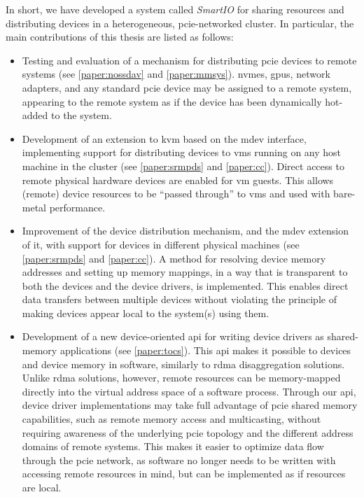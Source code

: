 In short, we have developed a system called \emph{SmartIO} for sharing resources and distributing devices in a heterogeneous, \gls{pcie}-networked cluster. 
%
In particular, the main contributions of this thesis are listed as follows:
\begin{itemize}
    \item Testing and evaluation of a mechanism for distributing \gls{pcie} devices to remote systems (see \cref{paper:nossdav} and \cref{paper:mmsys}). \Glspl{nvme}, \glspl{gpu}, network adapters, and any standard \gls{pcie} device may be assigned to a remote system, appearing to the remote system as if the device has been dynamically hot-added to the system.

	\item Development of an extension to \gls{kvm} based on the \gls{mdev} interface, implementing support for distributing devices to \glspl{vm} running on any host machine in the cluster (see \cref{paper:srmpds} and \cref{paper:cc}). Direct access to remote physical hardware devices are enabled for \gls{vm} guests. This allows (remote) device resources to be ``passed through'' to \glspl{vm} and used with bare-metal performance.
	
    \item Improvement of the device distribution mechanism, and the \gls{mdev} extension of it, with support for devices in different physical machines (see \cref{paper:srmpds} and \cref{paper:cc}). A method for resolving device memory addresses and setting up memory mappings, in a way that is transparent to both the devices and the device drivers, is implemented. This enables direct data transfers between multiple devices without violating the principle of making devices appear local to the system(s) using them.

    \item Development of a new device-oriented \gls{api} for writing device drivers as shared-memory applications (see \cref{paper:tocs}).
	This \gls{api} makes it possible to  devices and device memory in software, similarly to \gls{rdma} \gls{disaggregation} solutions.
	Unlike \gls{rdma} solutions, however, remote resources can be memory-mapped directly into the virtual address space of a software process.
	Through our \gls{api}, device driver implementations may take full advantage of \gls{pcie}
	shared memory capabilities, such as remote memory access and multicasting, without requiring
	awareness of the underlying \gls{pcie} topology and the different address domains of remote systems.
	This makes it easier to optimize data flow through the \gls{pcie} network, as software no longer needs to be written with accessing remote resources in mind, but can be implemented as if resources are local.


\end{itemize}
